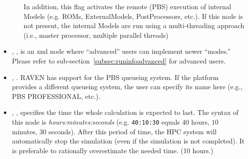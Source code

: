 \begin{itemize}
\begin{itemize}
\begin{itemize}
         \end{itemize}
         In addition, this flag activates the remote (PBS) execution of internal Models (e.g. ROMs,
         ExternalModels, PostProcessors, etc.). If this node is not present, the internal Models
           are run using a multi-threading approach (i.e., master processor, multiple parallel threads)
   \end{itemize}


\item {}, , is an
xml node where ``advanced'' users can implement newer ``modes.''
%
Please refer to sub-section~\ref{subsec:runinfoadvanced} for advanced users.

\item {}, .
RAVEN has support for the PBS queueing system. If the platform provides a
different queueing system, the user can specify its name here (e.g., PBS
PROFESSIONAL, etc.).
%

\item {}, , specifies the time the whole calculation is expected to
last.
%
The syntax of this node is \textit{hours:minutes:seconds} (e.g.
\texttt{40:10:30} equals $40$ hours, $10$ minutes, $30$ seconds). After this
period of time, the HPC system will automatically stop the simulation (even if
the simulation is not completed). It is preferable to rationally overestimate
the needed time.
%
 (10 hours.)
\end{itemize}

